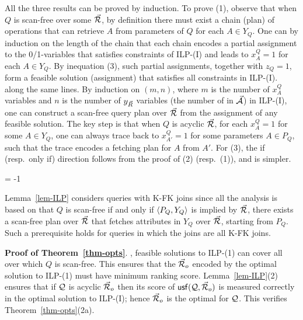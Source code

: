 \begin{proofS}
All the three results can be proved by induction. 
To prove (1), observe that when $Q$ is scan-free
over some \bds $\vec{{\mathcal R}}$, by definition there must exist a chain
(\ie plan)
of \get operations that can retrieve $A$ from parameters of $Q$
for each $A\in Y_{Q}$. One can  by induction on the length
of the chain that each chain encodes a partial assignment to the
0/1-variables that satisfies  constraints of ILP-(I) and leads to
$x_{A}^{Q} = 1$ for each $A\in Y_{Q}$. By inequation (3), such
partial assignments, together with $z_{Q} = 1$, form a feasible
solution (\ie assignment) that satisfies all  constraints
in ILP-(I).
%
 along the same lines. By induction on $(m, n)$,
where $m$ is the number of $x_{A}^{Q}$ variables and $n$ is the
number of $y_{\vec{R}}$ variables (\ie the number of \bss in
$\vec{{\mathcal A}}$) in ILP-(I), one can construct a scan-free query plan
over $\vec{{\mathcal R}}$ from the assignment of any feasible solution. The
key step is that when $Q$ is acyclic \wrt $\vec{{\mathcal R}}$, for each
$x_{A}^{Q} = 1$ for some $A\in Y_{Q}$, one can always trace back
to $x_{A'}^{Q} = 1$ for some parameters $A\in P_{Q}$, such that
the trace encodes a fetching plan for $A$ from $A'$.
For (3), the if (resp.~only if) direction follows from the proof
of (2) (resp.~(1)), and is simpler. 
\end{proofS}
\looseness = -1

Lemma~\ref{lem-ILP} considers \SPC queries with K-FK joins 
since all the analysis is based on that $Q$ is
 scan-free if and only if $\langle P_{Q},\allowbreak Y_{Q}\rangle$ is
implied by $\vec{{\mathcal R}}$, \ie there exists a  scan-free
plan over $\vec{{\mathcal R}}$ that fetches attributes in $Y_{Q}$ over
$\vec{{\mathcal R}}$, starting from $P_{Q}$. Such a prerequisite holds for
\SPC queries in which the joins are all K-FK joins.



\vspace{0.8ex}
\noindent
    {\bf Proof of Theorem~\ref{thm-opts}}. , feasible solutions to ILP-(1) can
cover all \bdss over which $Q$ is scan-free. This ensures that
the \bds $\vec{{\mathcal R}}_{o}$ encoded by the optimal solution to ILP-(1)
must have  minimum ranking score.
Lemma~\ref{lem-ILP}(2) ensures that if $\mathcal Q$ is
acyclic \wrt $\vec{{\mathcal R}}_{o}$ then its score of ${\mathsf{usf}}(\mathcal Q,\allowbreak
\vec{{\mathcal R}}_{o})$ is measured correctly in the optimal solution to
ILP-(I); hence $\vec{{\mathcal R}}_{o}$ is the optimal \bds for $\mathcal Q$. This
verifies Theorem~\ref{thm-opts}(2a).


